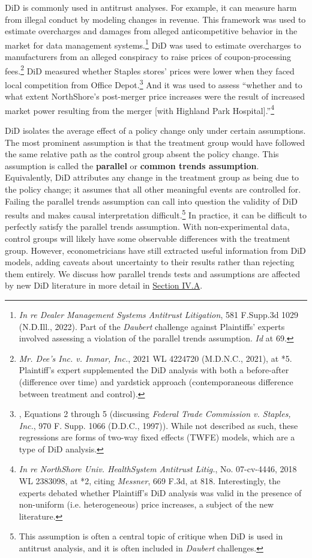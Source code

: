 \documentclass[12pt]{article}
\begin{document}
DiD is commonly used in antitrust analyses. For example, it can measure harm from illegal conduct by modeling changes in revenue. This framework was used to estimate overcharges and damages from alleged anticompetitive behavior in the market for data management systems.\footnote{\textit{In re Dealer Management Systems Antitrust Litigation}, 581 F.Supp.3d 1029 (N.D.Ill., 2022). Part of the \textit{Daubert} challenge against Plaintiffs’ experts involved assessing a violation of the parallel trends assumption. \textit{Id} at 69.}  DiD was used to estimate overcharges to manufacturers from an alleged conspiracy to raise prices of coupon-processing fees.\footnote{\textit{Mr. Dee's Inc. v. Inmar, Inc.}, 2021 WL 4224720 (M.D.N.C., 2021), at *5. Plaintiff’s expert supplemented the DiD analysis with both a before-after (difference over time) and yardstick approach (contemporaneous difference between treatment and control). }  DiD measured whether Staples stores’ prices were lower when they faced local competition from Office Depot.\footnote{\citet{ashenfelter2004}, Equations 2 through 5 (discussing  \textit{Federal Trade Commission v. Staples, Inc.}, 970 F. Supp. 1066 (D.D.C., 1997)). While not described as such, these regressions are forms of two-way fixed effects (TWFE) models, which are a type of DiD analysis.}  And it was used to assess “whether and to what extent NorthShore's post-merger price increases were the result of increased market power resulting from the merger [with Highland Park Hospital].”\footnote{\textit{In re NorthShore Univ. HealthSystem Antitrust Litig.}, No. 07-cv-4446, 2018 WL 2383098, at *2, citing \textit{Messner}, 669 F.3d, at 818. Interestingly, the experts debated whether Plaintiff’s DiD analysis was valid in the presence of non-uniform (i.e. heterogeneous) price increases, a subject of the new literature.} 

DiD isolates the average effect of a policy change only under certain assumptions. The most prominent assumption is that the treatment group would have followed the same relative path as the control group absent the policy change. This assumption is called the \textbf{parallel} or \textbf{common trends assumption}. Equivalently, DiD attributes any change in the treatment group as being due to the policy change; it assumes that all other meaningful events are controlled for. Failing the parallel trends assumption can call into question the validity of DiD results and makes causal interpretation difficult.\footnote{This assumption is often a central topic of critique when DiD is used in antitrust analysis, and it is often included in \textit{Daubert} challenges.} In practice, it can be difficult to perfectly satisfy the parallel trends assumption. With non-experimental data, control groups will likely have some observable differences with the treatment group. However, econometricians have still extracted useful information from DiD models, adding caveats about uncertainty to their results rather than rejecting them entirely. We discuss how parallel trends tests and assumptions are affected by new DiD literature in more detail in \hyperref[sec:parallel-trends]{Section IV.A}.
\end{document}
